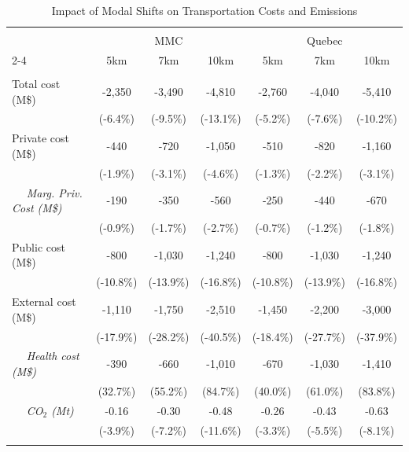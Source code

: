\begin{table}[H] \centering 
\footnotesize \singlespacing
  \caption{Impact of Modal Shifts on Transportation Costs and Emissions}
 \label{table:gains} 
\begin{tabular}{@{\extracolsep{5pt}}lcccccc} 
\\[-1.8ex]\hline 
\hline \\[-1.8ex] 
& \multicolumn{3}{c}{MMC} & \multicolumn{3}{c}{Quebec} \\ 
\cline{2-4} \cline{5-7} 
 & 5km & 7km & 10km & 5km & 7km & 10km \\ 
\hline \\[-1.8ex] 
Total cost (M\$) & -2,350 & -3,490 & -4,810 & -2,760 & -4,040 & -5,410 \\ 
 & (-6.4\%) & (-9.5\%) & (-13.1\%) & (-5.2\%) & (-7.6\%) & (-10.2\%) \\ 
\hline
Private cost (M\$) & -440 & -720 & -1,050 & -510 & -820 & -1,160 \\ 
 & (-1.9\%) & (-3.1\%) & (-4.6\%) & (-1.3\%) & (-2.2\%) & (-3.1\%) \\ 
$\quad$ \textit{Marg. Priv. Cost (M\$)} & -190 & -350 & -560 & -250 & -440 & -670 \\ 
 & (-0.9\%) & (-1.7\%) & (-2.7\%) & (-0.7\%) & (-1.2\%) & (-1.8\%) \\ 
Public cost (M\$) & -800 & -1,030 & -1,240 & -800 & -1,030 & -1,240 \\ 
 & (-10.8\%) & (-13.9\%) & (-16.8\%) & (-10.8\%) & (-13.9\%) & (-16.8\%) \\ 
External cost (M\$) & -1,110 & -1,750 & -2,510 & -1,450 & -2,200 & -3,000 \\ 
 & (-17.9\%) & (-28.2\%) & (-40.5\%) & (-18.4\%) & (-27.7\%) & (-37.9\%) \\ 
$\quad$ \textit{Health cost (M\$)} & -390 & -660 & -1,010 & -670 & -1,030 & -1,410 \\ 
 & (32.7\%) & (55.2\%) & (84.7\%) & (40.0\%) & (61.0\%) & (83.8\%) \\ 
$\quad$  \textit{CO$_2$ (Mt)} & -0.16 & -0.30 & -0.48 & -0.26 & -0.43 & -0.63 \\ 
 & (-3.9\%) & (-7.2\%) & (-11.6\%) & (-3.3\%) & (-5.5\%) & (-8.1\%) \\ 
\hline \\[-1.8ex] 
\end{tabular} 
\end{table} 
